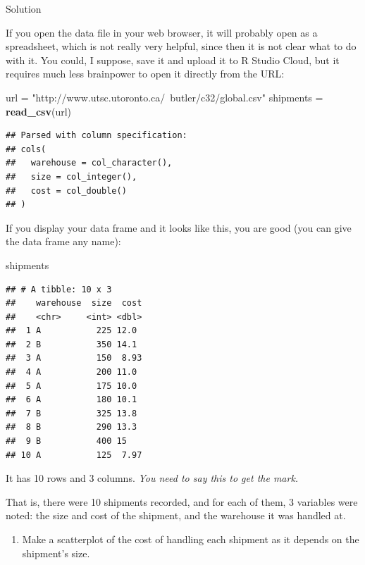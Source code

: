 \documentclass[]{tufte-book}
\newenvironment{Shaded}{}{}
\newcommand{\KeywordTok}[1]{\textcolor[rgb]{0.00,0.44,0.13}{\textbf{#1}}}
\newcommand{\NormalTok}[1]{#1}
\newcommand{\StringTok}[1]{\textcolor[rgb]{0.25,0.44,0.63}{#1}}
\providecommand{\tightlist}{%
  \setlength{\itemsep}{0pt}\setlength{\parskip}{0pt}}
\theoremstyle{definition}
\theoremstyle{definition}
\theoremstyle{definition}
\theoremstyle{remark}
\begin{document}
Solution

If you open the data file in your web browser, it will probably open as
a spreadsheet, which is not really very helpful, since then it is not
clear what to do with it. You could, I suppose, save it and upload it to
R Studio Cloud, but it requires much less brainpower to open it directly
from the URL:

\begin{Shaded}
\begin{Highlighting}[]
\NormalTok{url =}\StringTok{ "http://www.utsc.utoronto.ca/~butler/c32/global.csv"}
\NormalTok{shipments =}\StringTok{ }\KeywordTok{read_csv}\NormalTok{(url)}
\end{Highlighting}
\end{Shaded}

\begin{verbatim}
## Parsed with column specification:
## cols(
##   warehouse = col_character(),
##   size = col_integer(),
##   cost = col_double()
## )
\end{verbatim}

If you display your data frame and it looks like this, you are good (you
can give the data frame any name):

\begin{Shaded}
\begin{Highlighting}[]
\NormalTok{shipments}
\end{Highlighting}
\end{Shaded}

\begin{verbatim}
## # A tibble: 10 x 3
##    warehouse  size  cost
##    <chr>     <int> <dbl>
##  1 A           225 12.0 
##  2 B           350 14.1 
##  3 A           150  8.93
##  4 A           200 11.0 
##  5 A           175 10.0 
##  6 A           180 10.1 
##  7 B           325 13.8 
##  8 B           290 13.3 
##  9 B           400 15   
## 10 A           125  7.97
\end{verbatim}

It has 10 rows and 3 columns. \emph{You need to say this to get the
mark.}

That is, there were 10 shipments recorded, and for each of them, 3
variables were noted: the size and cost of the shipment, and the
warehouse it was handled at.

\begin{enumerate}
\def\labelenumi{(\alph{enumi})}
\setcounter{enumi}{1}
\tightlist
\item
  Make a scatterplot of the cost of handling each shipment as it depends
  on the shipment's size.
\end{enumerate}
\end{document}
